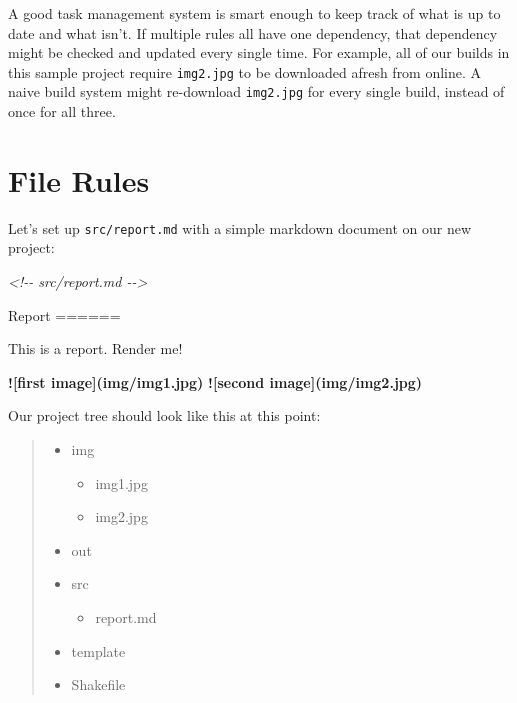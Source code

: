\documentclass[]{article}
\newenvironment{Shaded}{}{}
\newcommand{\AlertTok}[1]{\textcolor[rgb]{1.00,0.00,0.00}{\textbf{#1}}}
\newcommand{\CommentTok}[1]{\textcolor[rgb]{0.38,0.63,0.69}{\textit{#1}}}
\newcommand{\FunctionTok}[1]{\textcolor[rgb]{0.02,0.16,0.49}{#1}}
\newcommand{\NormalTok}[1]{#1}
\begin{document}
A good task management system is smart enough to keep track of what is up to
date and what isn't. If multiple rules all have one dependency, that dependency
might be checked and updated every single time. For example, all of our builds
in this sample project require \texttt{img2.jpg} to be downloaded afresh from
online. A naive build system might re-download \texttt{img2.jpg} for every
single build, instead of once for all three.

\section{File Rules}\label{file-rules}

Let's set up \texttt{src/report.md} with a simple markdown document on our new
project:

\begin{Shaded}
\begin{Highlighting}[]
\CommentTok{\textless{}!{-}{-} src/report.md {-}{-}\textgreater{}}

\NormalTok{Report}
\FunctionTok{======}

\NormalTok{This is a report.  Render me!}

\AlertTok{![first image](img/img1.jpg)}
\AlertTok{![second image](img/img2.jpg)}
\end{Highlighting}
\end{Shaded}

Our project tree should look like this at this point:

\begin{quote}
\begin{itemize}
\tightlist
\item
  img

  \begin{itemize}
  \tightlist
  \item
    img1.jpg
  \item
    img2.jpg
  \end{itemize}
\item
  out
\item
  src

  \begin{itemize}
  \tightlist
  \item
    report.md
  \end{itemize}
\item
  template
\item
  Shakefile
\end{itemize}
\end{quote}
\end{document}
